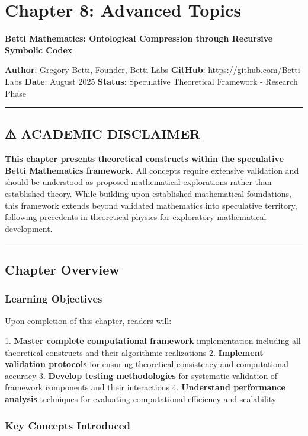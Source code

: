 \chapter{Chapter 8: Advanced Topics}

\textbf{Betti Mathematics: Ontological Compression through Recursive Symbolic Codex}

\textbf{Author}: Gregory Betti, Founder, Betti Labs  
\textbf{GitHub}: https://github.com/Betti-Labs  
\textbf{Date}: August 2025  
\textbf{Status}: Speculative Theoretical Framework - Research Phase

\hrule

\section{⚠️ ACADEMIC DISCLAIMER}

\textbf{This chapter presents theoretical constructs within the speculative Betti Mathematics framework.} All concepts require extensive validation and should be understood as proposed mathematical explorations rather than established theory. While building upon established mathematical foundations, this framework extends beyond validated mathematics into speculative territory, following precedents in theoretical physics for exploratory mathematical development.

\hrule

\section{Chapter Overview}

\subsection{Learning Objectives}

Upon completion of this chapter, readers will:

1. \textbf{Master complete computational framework} implementation including all theoretical constructs and their algorithmic realizations
2. \textbf{Implement validation protocols} for ensuring theoretical consistency and computational accuracy
3. \textbf{Develop testing methodologies} for systematic validation of framework components and their interactions
4. \textbf{Understand performance analysis} techniques for evaluating computational efficiency and scalability

\subsection{Key Concepts Introduced}

